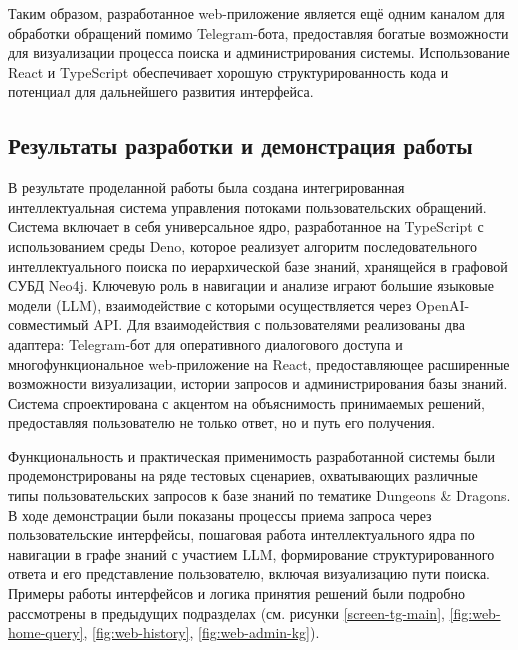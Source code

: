 
Таким образом, разработанное web-приложение является ещё одним каналом для обработки обращений помимо Telegram-бота, предоставляя богатые возможности для визуализации процесса поиска и администрирования системы. Использование React и TypeScript обеспечивает хорошую структурированность кода и потенциал для дальнейшего развития интерфейса.

\subsection{Результаты разработки и демонстрация работы}

В результате проделанной работы была создана интегрированная интеллектуальная система управления потоками пользовательских обращений. Система включает в себя универсальное ядро, разработанное на TypeScript с использованием среды Deno, которое реализует алгоритм последовательного интеллектуального поиска по иерархической базе знаний, хранящейся в графовой СУБД Neo4j. Ключевую роль в навигации и анализе играют большие языковые модели (LLM), взаимодействие с которыми осуществляется через OpenAI-совместимый API. Для взаимодействия с пользователями реализованы два адаптера: Telegram-бот для оперативного диалогового доступа и многофункциональное web-приложение на React, предоставляющее расширенные возможности визуализации, истории запросов и администрирования базы знаний. Система спроектирована с акцентом на объяснимость принимаемых решений, предоставляя пользователю не только ответ, но и путь его получения.

Функциональность и практическая применимость разработанной системы были продемонстрированы на ряде тестовых сценариев, охватывающих различные типы пользовательских запросов к базе знаний по тематике Dungeons \& Dragons. В ходе демонстрации были показаны процессы приема запроса через пользовательские интерфейсы, пошаговая работа интеллектуального ядра по навигации в графе знаний с участием LLM, формирование структурированного ответа и его представление пользователю, включая визуализацию пути поиска. Примеры работы интерфейсов и логика принятия решений были подробно рассмотрены в предыдущих подразделах (см. рисунки \ref{screen-tg-main}, \ref{fig:web-home-query}, \ref{fig:web-history}, \ref{fig:web-admin-kg}).

